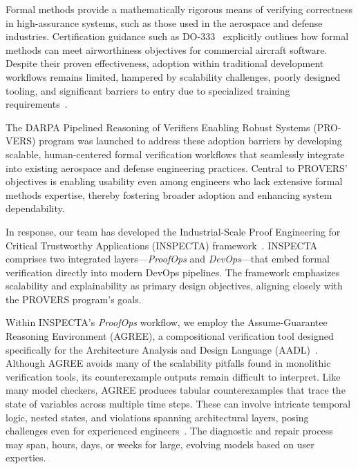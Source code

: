 Formal methods provide a mathematically rigorous means of verifying correctness in high-assurance systems, such as those used in the aerospace and defense industries. Certification guidance such as DO-333~\cite{DO-333} explicitly outlines how formal methods can meet airworthiness objectives for commercial aircraft software. Despite their proven effectiveness, adoption within traditional development workflows remains limited, hampered by scalability challenges, poorly designed tooling, and significant barriers to entry due to specialized training requirements~\cite{davis-fmics13}.

The DARPA Pipelined Reasoning of Verifiers Enabling Robust Systems (PRO-VERS) program was launched to address these adoption barriers by developing scalable, human-centered formal verification workflows that seamlessly integrate into existing aerospace and defense engineering practices. Central to PROVERS' objectives is enabling usability even among engineers who lack extensive formal methods expertise, thereby fostering broader adoption and enhancing system dependability.

In response, our team has developed the Industrial-Scale Proof Engineering for Critical Trustworthy Applications (INSPECTA) framework~\cite{inspecta}. INSPECTA comprises two integrated layers—\textit{ProofOps} and \textit{DevOps}—that embed formal verification directly into modern DevOps pipelines. The framework emphasizes scalability and explainability as primary design objectives, aligning closely with the PROVERS program’s goals.

Within INSPECTA’s \textit{ProofOps} workflow, we employ the Assume-Guarantee Reasoning Environment (AGREE)\cite{compositional-analysis-agree}, a compositional verification tool designed specifically for the Architecture Analysis and Design Language (AADL)~\cite{feiler-aadl}.
%
Although AGREE avoids many of the scalability pitfalls found in monolithic verification tools, its counterexample outputs remain difficult to interpret. Like many model checkers, AGREE produces tabular counterexamples that trace the state of variables across multiple time steps. These can involve intricate temporal logic, nested states, and violations spanning architectural layers, posing challenges even for experienced engineers~\cite{cex-explanation}. The diagnostic and repair process may span, hours, days, or weeks for large, evolving models based on user experties.

